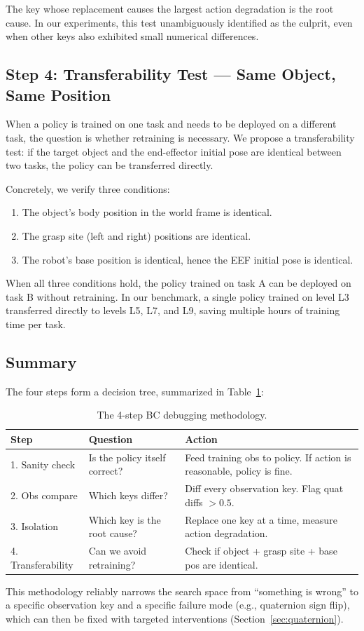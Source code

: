 The key whose replacement causes the largest action degradation is the root cause. In our experiments, this test unambiguously identified  as the culprit, even when other keys also exhibited small numerical differences.

\subsection{Step 4: Transferability Test --- Same Object, Same Position}
\label{sec:methodology:transfer}

When a policy is trained on one task and needs to be deployed on a different task, the question is whether retraining is necessary. We propose a transferability test: if the target object and the end-effector initial pose are identical between two tasks, the policy can be transferred directly.

Concretely, we verify three conditions:
\begin{enumerate}[leftmargin=*,itemsep=2pt]
    \item The object's body position in the world frame is identical.
    \item The grasp site (left and right) positions are identical.
    \item The robot's base position is identical, hence the EEF initial pose is identical.
\end{enumerate}

When all three conditions hold, the policy trained on task A can be deployed on task B without retraining. In our benchmark, a single policy trained on level L3 transferred directly to levels L5, L7, and L9, saving multiple hours of training time per task.

\subsection{Summary}
\label{sec:methodology:summary}

The four steps form a decision tree, summarized in Table~\ref{tab:methodology}:

\begin{table}[h]
\centering
\caption{The 4-step BC debugging methodology.}
\label{tab:methodology}
\small
\begin{tabular}{p{} p{} p{}}
\toprule
\textbf{Step} & \textbf{Question} & \textbf{Action} \\
\midrule
1. Sanity check & Is the policy itself correct? & Feed training obs to policy. If action is reasonable, policy is fine. \\
2. Obs compare & Which keys differ? & Diff every observation key. Flag quat diffs $>0.5$. \\
3. Isolation & Which key is the root cause? & Replace one key at a time, measure action degradation. \\
4. Transferability & Can we avoid retraining? & Check if object + grasp site + base pos are identical. \\
\bottomrule
\end{tabular}
\end{table}

This methodology reliably narrows the search space from ``something is wrong'' to a specific observation key and a specific failure mode (e.g., quaternion sign flip), which can then be fixed with targeted interventions (Section~\ref{sec:quaternion}).
